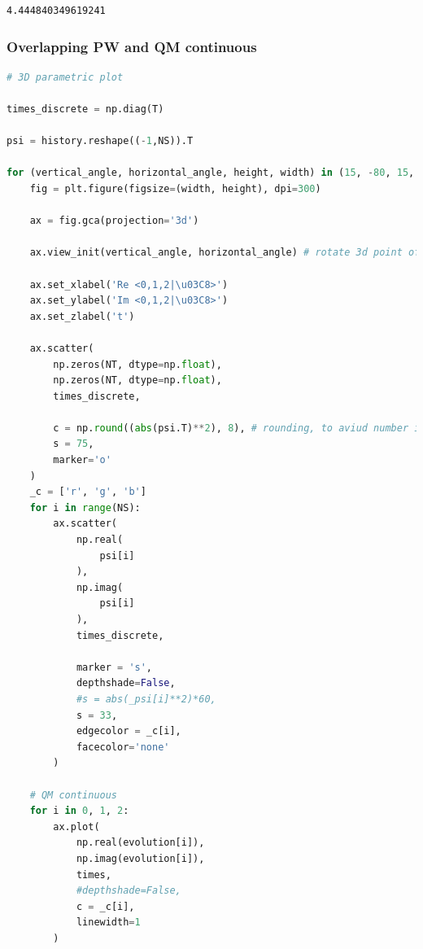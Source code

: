 \begin{lstlisting}
4.444840349619241
\end{lstlisting}

\hypertarget{overlapping-pw-and-qm-continuous}{%
\subsubsection{Overlapping PW and QM
continuous}\label{overlapping-pw-and-qm-continuous}}

\begin{lstlisting}[language=Python]
# 3D parametric plot

times_discrete = np.diag(T)

psi = history.reshape((-1,NS)).T

for (vertical_angle, horizontal_angle, height, width) in (15, -80, 15, 15), (90, -80, 15, 15):
    fig = plt.figure(figsize=(width, height), dpi=300)

    ax = fig.gca(projection='3d')

    ax.view_init(vertical_angle, horizontal_angle) # rotate 3d point of view

    ax.set_xlabel('Re <0,1,2|\u03C8>')
    ax.set_ylabel('Im <0,1,2|\u03C8>')
    ax.set_zlabel('t')
    
    ax.scatter(
        np.zeros(NT, dtype=np.float),
        np.zeros(NT, dtype=np.float),
        times_discrete,
    
        c = np.round((abs(psi.T)**2), 8), # rounding, to aviud number instability causing out-of-range rgb vals
        s = 75,
        marker='o'
    )
    _c = ['r', 'g', 'b']
    for i in range(NS):
        ax.scatter(
            np.real(
                psi[i]
            ),
            np.imag(
                psi[i]
            ),
            times_discrete,

            marker = 's',
            depthshade=False,
            #s = abs(_psi[i]**2)*60,
            s = 33,
            edgecolor = _c[i],
            facecolor='none'
        )
        
    # QM continuous
    for i in 0, 1, 2:
        ax.plot(
            np.real(evolution[i]),
            np.imag(evolution[i]),
            times,
            #depthshade=False,
            c = _c[i],
            linewidth=1
        )
\end{lstlisting}

